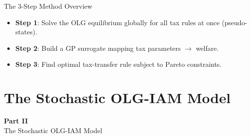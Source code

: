 \documentclass[aspectratio=169,11pt]{beamer}
\newcommand{\emphc}[1]{\textcolor{harvardcrimson}{#1}}
\begin{document}
\begin{frame}{The 3-Step Method Overview}
\begin{center}
\end{center}

\vspace{0.3cm}
\begin{itemize}
    \item \textbf{Step 1}: Solve the OLG equilibrium globally for \emphc{all} tax rules at once (pseudo-states).
    \item \textbf{Step 2}: Build a GP surrogate mapping tax parameters $\rightarrow$ welfare.
    \item \textbf{Step 3}: Find optimal tax-transfer rule subject to Pareto constraints.
\end{itemize}
\end{frame}

\section{The Stochastic OLG-IAM Model}

\begin{frame}{}
\vfill
\begin{center}
{\Huge \textcolor{uzhblue}{\textbf{Part II}}}\\[12pt]
{\LARGE The Stochastic OLG-IAM Model}
\end{center}
\vfill
\end{frame}
\end{document}
